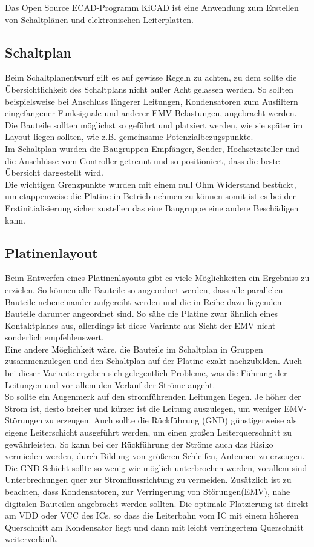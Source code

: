 
Das Open Source ECAD-Programm KiCAD ist eine Anwendung zum Erstellen von Schaltplänen und elektronischen Leiterplatten. 

\subsection{Schaltplan}
Beim Schaltplanentwurf gilt es auf gewisse Regeln zu achten, zu dem sollte die Übersichtlichkeit des Schaltplans nicht außer Acht gelassen werden.
So sollten beispielsweise bei Anschluss längerer Leitungen, Kondensatoren zum Ausfiltern eingefangener Funksignale und anderer EMV-Belastungen, angebracht werden. Die Bauteile sollten möglichst so geführt und platziert werden, wie sie später im Layout liegen sollten, wie z.B. gemeinsame Potenzialbezugspunkte.\\
Im Schaltplan wurden die Baugruppen Empfänger, Sender, Hochsetzsteller und die Anschlüsse vom Controller getrennt und so positioniert, dass die beste Übersicht dargestellt wird.\\
Die wichtigen Grenzpunkte wurden mit einem null Ohm Widerstand bestückt, um etappenweise die Platine in Betrieb nehmen zu können somit ist es bei der Erstinitialisierung
sicher zustellen das eine Baugruppe eine andere Beschädigen kann. \\   

\subsection{Platinenlayout}
Beim Entwerfen eines Platinenlayouts gibt es viele Möglichkeiten ein Ergebniss zu erzielen. So können alle Bauteile so angeordnet werden, dass alle parallelen Bauteile nebeneinander aufgereiht werden und die in Reihe dazu liegenden Bauteile darunter angeordnet sind. So sähe die Platine zwar ähnlich eines Kontaktplanes aus, allerdings ist diese Variante aus Sicht der EMV nicht sonderlich empfehlenswert.\\
Eine andere Möglichkeit wäre, die Bauteile im Schaltplan in Gruppen zusammenzulegen und den Schaltplan auf der Platine exakt nachzubilden. Auch bei dieser Variante ergeben sich gelegentlich Probleme, was die Führung der Leitungen und vor allem den Verlauf der Ströme angeht.\\
So sollte ein Augenmerk auf den stromführenden Leitungen liegen. Je höher der Strom ist, desto breiter und kürzer ist die Leitung auszulegen, um weniger EMV-Störungen zu erzeugen. Auch sollte die Rückführung (GND) günstigerweise als eigene Leiterschicht ausgeführt werden, um einen großen Leiterquerschnitt zu gewährleisten. So kann bei der Rückführung der Ströme auch das Risiko vermieden werden, durch Bildung von größeren Schleifen, Antennen zu erzeugen. Die GND-Schicht sollte so wenig wie möglich unterbrochen werden, vorallem sind Unterbrechungen quer zur Stromflussrichtung zu vermeiden. Zusätzlich ist zu beachten, dass Kondensatoren, zur Verringerung von Störungen(EMV), nahe digitalen Bauteilen angebracht werden sollten. Die optimale Platzierung ist direkt am VDD oder VCC des ICs, so dass die Leiterbahn vom IC mit einem höheren Querschnitt am Kondensator liegt und dann mit leicht verringertem Querschnitt weiterverläuft.


